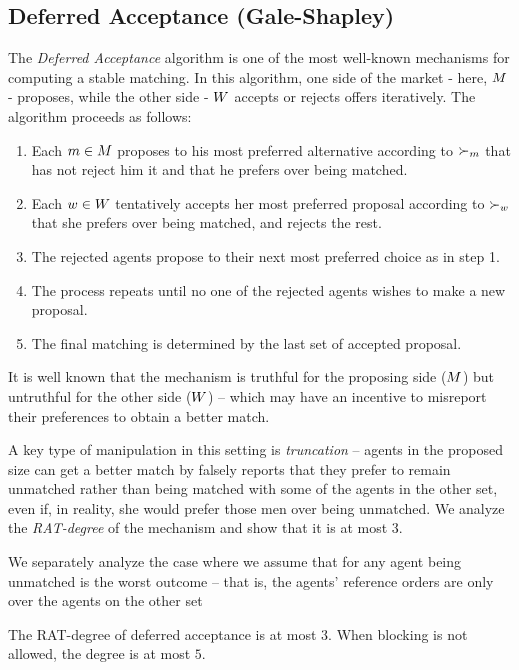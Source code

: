 \subsection{Deferred Acceptance (Gale-Shapley)}
The \emph{Deferred Acceptance} algorithm \cite{} is one of the most well-known mechanisms for computing a stable matching. 
In this algorithm, one side of the market - here, $M$ - proposes, while the other side - $W$ accepts or rejects offers iteratively. 
The algorithm proceeds as follows:
\begin{enumerate}
    \item Each $m \in M$ proposes to his most preferred alternative according to $\succ_{m}$ that has not reject him it and that he prefers over being matched. 

    \item Each $w \in W$ tentatively accepts her most preferred proposal according to $\succ_{w}$ that she prefers over being matched, and rejects the rest.

    \item The rejected agents propose to their next most preferred choice as in step 1.

    \item The process repeats until no one of the rejected agents wishes to make a new proposal.

    \item The final matching is determined by the last set of accepted proposal.
\end{enumerate}


It is well known that the mechanism is truthful for the proposing side ($M$) but untruthful for the other side ($W$) -- which may have an incentive to misreport their preferences to obtain a better match.

A key type of manipulation in this setting is \emph{truncation} \cite{coles2014optimal} -- agents in the proposed size can get a better match by falsely reports that they prefer to remain unmatched rather than being matched with some of the agents in the other set, even if, in reality, she would prefer those men over being unmatched. 
We analyze the \emph{RAT-degree} of the mechanism and show that it is at most $3$. 


We separately analyze the case where we assume that for any agent being unmatched is the worst outcome -- that is, the agents' reference orders are only over the agents on the other set 
 
\begin{proposition}
    The RAT-degree of deferred acceptance is at most $3$. When blocking is not allowed, the degree is at most $5$.
\end{proposition}
